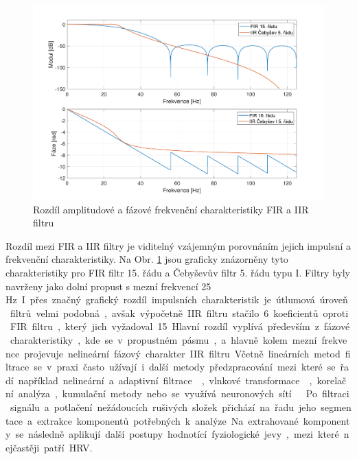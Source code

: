 \begin{figure}[h]
	\begin{center}
		\includegraphics[width=1\textwidth]{../assets/figures/filters_comparison}
		\caption{Rozdíl amplitudové a fázové frekvenční charakteristiky FIR a IIR filtru}
		\label{fig:filters_comparison}
	\end{center}
\end{figure}

Rozdíl mezi FIR a IIR filtry je viditelný vzájemným porovnáním jejich impulsní a
frekvenční charakteristiky. Na Obr. \ref{fig:filters_comparison} jsou graficky
znázorněny tyto charakteristiky pro FIR filtr 15. řádu a Čebyševův filtr 5. řádu
typu I. Filtry byly navrženy jako dolní propust s mezní frekvencí 25 \si\Hz. I
přes značný grafický rozdíl impulsních charakteristik je útlumová úroveň filtrů
velmi podobná, avšak výpočetně IIR filtru stačilo 6 koeficientů oproti FIR
filtru, který jich vyžadoval 15. Hlavní rozdíl vyplívá především z fázové
charakteristiky, kde se v propustném pásmu, a hlavně kolem mezní frekvence
projevuje nelineární fázový charakter IIR filtru.

Včetně lineárních metod filtrace se v praxi často užívají i další metody
předzpracování mezi které se řadí například nelineární a adaptivní filtrace
\cite{Sornmo1982,Pan1985}, vlnkové transformace \cite{Yao2020,Ndiaye2020},
korelační analýza, kumulační metody nebo se využívá neuronových
sítí\cite{Kiranyaz2016,Zhai2018} \cite{Jan2002}. Po filtraci signálu a potlačení
nežádoucích rušivých složek přichází na řadu jeho segmentace a extrakce
komponentů potřebných k analýze. Na extrahované komponenty se následně aplikují
další postupy hodnotící fyziologické jevy, mezi které nejčastěji patří HRV.

